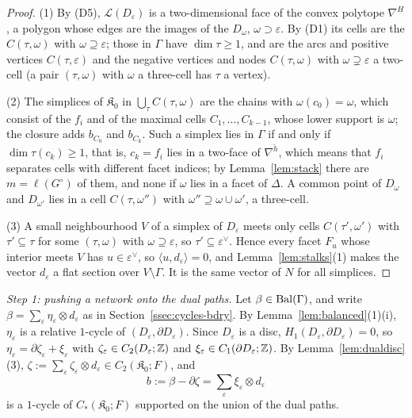 \begin{proof}
(1) By (D5), $\mathcal L(D_\varepsilon)$ is a two-dimensional face of the convex polytope $\nabla^H$, a polygon whose edges
are the images of the $D_\omega$, $\omega\supset\varepsilon$. By (D1) its cells are the $C(\tau,\omega)$ with $\omega\supseteq
\varepsilon$; those in $\Gamma$ have $\dim\tau\ge1$, and are the arcs and positive vertices $C(\tau,\varepsilon)$ and the
negative vertices and nodes $C(\tau,\omega)$ with $\omega\supsetneq\varepsilon$ a two-cell (a pair $(\tau,\omega)$ with
$\omega$ a three-cell has $\tau$ a vertex).

(2) The simplices of $\mathfrak K_0$ in $\bigcup_\tau C(\tau,\omega)$ are the chains with $\omega(c_0)=\omega$, which consist of
the $f_i$ and of the maximal cells $C_1,\dots,C_{k-1}$, whose lower support is $\omega$; the closure adds $b_{C_0}$ and
$b_{C_k}$. Such a simplex lies in $\Gamma$ if and only if $\dim\tau(c_k)\ge1$, that is, $c_k=f_i$ lies in a two-face of
$\nabla^{\check h}$, which means that $f_i$ separates cells with different facet indices; by Lemma~\ref{lem:stack} there
are $m=\ell(G^\circ)$ of them, and none if $\omega$ lies in a facet of $\Delta$. A common point of $D_\omega$ and
$D_{\omega'}$ lies in a cell $C(\tau,\omega'')$ with $\omega''\supseteq\omega\cup\omega'$, a three-cell.

(3) A small neighbourhood $V$ of a simplex of $D_\varepsilon$ meets only cells $C(\tau',\omega')$ with $\tau'\subseteq\tau$ for
some $(\tau,\omega)$ with $\omega\supseteq\varepsilon$, so $\tau'\subseteq\varepsilon^\vee$. Hence every facet $F_u$ whose
interior meets $V$ has $u\in\varepsilon^\vee$, so $\langle u,d_\varepsilon\rangle=0$, and Lemma~\ref{lem:stalks}(1) makes the
vector $d_\varepsilon$ a flat section over $V\setminus\Gamma$. It is the same vector of $N$ for all simplices.
\end{proof}

\emph{Step 1: pushing a network onto the dual paths.} Let $\beta\in\mathrm{Bal}(\Gamma)$, and write
$\beta=\sum_\varepsilon\eta_\varepsilon\otimes d_\varepsilon$ as in Section~\ref{ssec:cycles-bdry}.
By Lemma~\ref{lem:balanced}(1)(i), $\eta_\varepsilon$ is a relative $1$-cycle of $(D_\varepsilon,\partial D_\varepsilon)$.
Since $D_\varepsilon$ is a disc, $H_1(D_\varepsilon,\partial D_\varepsilon)=0$, so $\eta_\varepsilon=\partial\zeta_\varepsilon+\xi_\varepsilon$
with $\zeta_\varepsilon\in C_2(D_\varepsilon;\mathbb Z)$ and $\xi_\varepsilon\in C_1(\partial D_\varepsilon;\mathbb Z)$. By
Lemma~\ref{lem:dualdisc}(3), $\zeta:=\sum_\varepsilon\zeta_\varepsilon\otimes d_\varepsilon\in C_2(\mathfrak K_0;F)$, and
\[
b:=\beta-\partial\zeta=\sum_\varepsilon\xi_\varepsilon\otimes d_\varepsilon
\]
is a $1$-cycle of $C_*(\mathfrak K_0;F)$ supported on the union of the dual paths.

